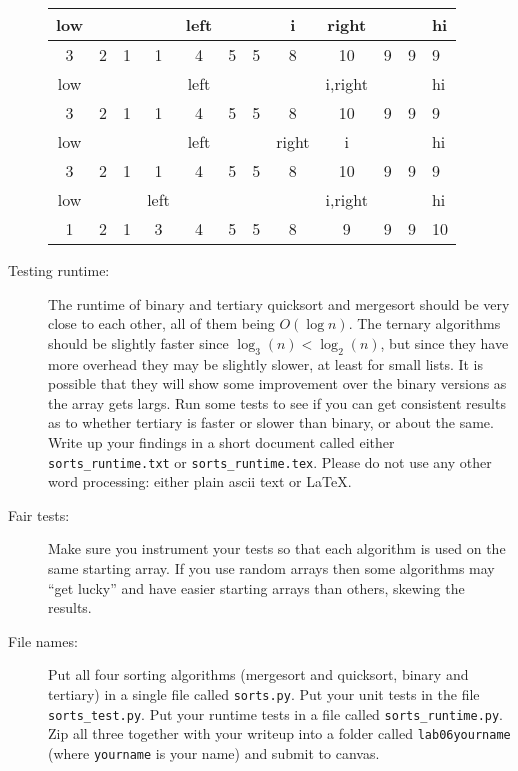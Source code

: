 \documentclass{article}
\begin{document}
\begin{description}
\begin{tabular}{|c|c|c|c|c|c|c|c|c|c|c|l|}
     low&        &        &        &    left&        &        &       i&   right&        &        &      hi\\\hline
       3&       2&       1&       1&       4&       5&       5&       8&      10&       9&       9&       9\\\hline\hline
     low&        &        &        &    left&        &        &        & i,right&        &        &      hi\\\hline
       3&       2&       1&       1&       4&       5&       5&       8&      10&       9&       9&       9\\\hline\hline
     low&        &        &        &    left&        &        &   right&       i&        &        &      hi\\\hline
       3&       2&       1&       1&       4&       5&       5&       8&      10&       9&       9&       9\\\hline\hline
     low&        &        &    left&        &        &        &        & i,right&        &        &      hi\\\hline
       1&       2&       1&       3&       4&       5&       5&       8&       9&       9&       9&      10\\\hline
\end{tabular}

\item[Testing runtime:]  The runtime of binary and tertiary quicksort and mergesort should
be very close to each other, all of them being $O(\log n)$.  The ternary algorithms
should be slightly faster since $\log_3(n) < \log_2(n)$, but since they have more
overhead they may be slightly slower, at least for small lists.
It is possible that they will show some improvement over the binary versions
as the array gets largs.  Run some tests to see if you can get consistent results
as to whether tertiary is faster or slower than binary, or about the same.  Write up
your findings in a short document called either \lstinline{sorts_runtime.txt} or
\lstinline{sorts_runtime.tex}.  Please do not use any other word processing:
either plain ascii text or \LaTeX.

\item[Fair tests:] Make sure you instrument your tests so that each algorithm
is used on the same starting array.  If you use random arrays then some algorithms
may ``get lucky'' and have easier starting arrays than others, skewing the results.

\item[File names:]  Put all four sorting algorithms (mergesort and quicksort, binary and
tertiary) in a single file called \verb|sorts.py|.  Put your unit tests in the file \verb|sorts_test.py|.
Put your runtime tests in a file called \verb|sorts_runtime.py|.  Zip all three together with 
your writeup into a folder
called \verb|lab06yourname| (where \verb|yourname| is your name) and submit to canvas.

\end{description}
\end{document}
